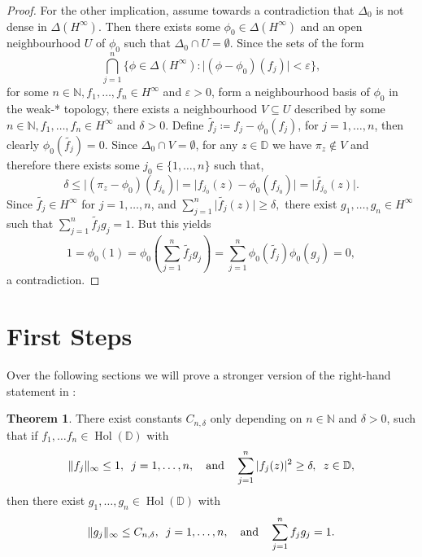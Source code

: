 \documentclass[letterpaper, 11pt]{article}
\newcommand{\D}{\mathbb{D}}
\newcommand{\N}{\mathbb{N}}
\newcommand{\1}{\mathds{1}}
\DeclareMathOperator*{\Hol}{Hol}
\theoremstyle{definition}
\newtheorem{theorem}{Theorem}
\begin{document}
\begin{proof}
  For the other implication, assume towards a contradiction that $\Delta_0$ is not dense in $\Delta(H^\infty)$. Then there exists some $\phi_0 \in \Delta(H^\infty)$ and an open neighbourhood $U$ of $\phi_0$ such that $\Delta_0 \cap U = \emptyset$. Since the sets of the form
  $$ \bigcap_{j=1}^n \{ \phi \in \Delta(H^\infty) : \vert (\phi - \phi_0)(f_j) \vert < \varepsilon \}, $$
  for some $n \in \N, f_1, \dots, f_n \in H^\infty$ and $\varepsilon > 0$, form a neighbourhood basis of $\phi_0$ in the weak\nobreakdash-* topology, there exists a neighbourhood $V \subseteq U$ described by some $n \in \N, f_1, \dots, f_n \in H^\infty$ and $\delta > 0$. Define $\widetilde{f_j} \coloneqq f_j - \phi_0(f_j)$, for $j=1,\dots,n$, then clearly $\phi_0(\widetilde{f_j}) = 0$. Since $\Delta_0 \cap V = \emptyset$, for any $z \in \D$ we have $\pi_z \notin V$ and therefore there exists some $j_0 \in \{ 1, \dots, n \}$ such that,
  $$ \delta \leq \vert (\pi_z - \phi_0)(f_{j_0}) \vert = \vert f_{j_0}(z) - \phi_0(f_{j_0}) \vert = \vert \widetilde{f_{j_0}}(z) \vert. $$
  Since $\widetilde{f_j} \in H^\infty$ for $j=1,\dots,n$, and $ \sum_{j=1}^n \vert \widetilde{f_j}(z) \vert \geq \delta, $ there exist $g_1, \dots, g_n \in H^\infty$ such that $\sum_{j=1}^n \widetilde{f_j} g_j = 1$. But this yields
  $$ 1 = \phi_0(1) = \phi_0 \left( \sum_{j=1}^n \widetilde{f_j} g_j \right) = \sum_{j=1}^n \phi_0(\widetilde{f_j}) \phi_0(g_j) = 0, $$
  a contradiction.
\end{proof}

\section{First Steps}

Over the following sections we will prove a stronger version of the right-hand statement in :

\begin{theorem}
  There exist constants $C_{n,\delta}$ only depending on $n \in \N$ and $\delta > 0$, such that if $f_1, \dots f_n \in \Hol(\D)$ with
  $$ \Vert f_j \Vert_\infty \leq 1, \hspace{0.5em} j = 1, \dots, n, \quad \textrm{and} \quad \sum_{j=1}^n \vert f_j(z) \vert^2 \geq \delta, \hspace{0.5em} z \in \D, $$
  then there exist $g_1, \dots, g_n \in \Hol(\D)$ with
  $$ \Vert g_j \Vert_\infty \leq C_{n,\delta}, \hspace{0.5em} j = 1, \dots, n, \quad \textrm{and} \quad \sum_{j=1}^n f_j g_j = 1. $$
\end{theorem}
\end{document}
